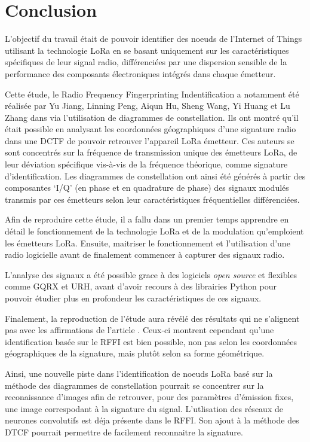 \chapter*{Conclusion}
\renewcommand{\leftmark}{CONCLUSION}

L'objectif du travail était de pouvoir identifier des noeuds de l'Internet of Things utilisant la technologie LoRa en se basant uniquement sur les caractéristiques spécifiques de leur signal radio, différenciées par une dispersion sensible de la performance des composants électroniques intégrés dans chaque émetteur.
\vspace{0.1cm}

Cette étude, le Radio Frequency Fingerprinting Indentification a notamment été réalisée par Yu Jiang, Linning Peng, Aiqun Hu, Sheng Wang, Yi Huang et Lu Zhang dans \cite{loraDCTF} via l'utilisation de diagrammes de constellation. Ils ont montré qu'il était possible en analysant les coordonnées géographiques d'une signature radio dans une DCTF de pouvoir retrouver l'appareil LoRa émetteur. Ces auteurs se sont concentrés sur la fréquence de transmission unique des émetteurs LoRa, de leur déviation spécifique vis-à-vis de la fréquence théorique, comme signature d'identification. Les diagrammes de constellation ont ainsi été générés à partir des composantes ‘I/Q’ (en phase et en quadrature de phase) des signaux modulés transmis par ces émetteurs selon leur caractéristiques fréquentielles différenciées.

\vspace{0.1cm}

Afin de reproduire cette étude, il a fallu dans un premier temps apprendre en détail le fonctionnement de la technologie LoRa et  de la modulation qu'emploient les émetteurs LoRa. Ensuite, maitriser le fonctionnement et l'utilisation d'une radio logicielle avant de finalement commencer à capturer des signaux radio.

\vspace{0.1cm}

L'analyse des signaux a été possible grace à des logiciels \textit{open source} et flexibles comme GQRX et URH, avant d'avoir recours à des librairies Python pour pouvoir étudier plus en profondeur les caractéristiques de ces signaux.

\vspace{0.1cm}

Finalement, la reproduction de l'étude aura révélé des résultats qui ne s'ali\-gnent pas avec les affirmations de l'article \cite{loraDCTF}. Ceux-ci montrent cependant qu'une identification basée sur le RFFI est bien possible, non pas selon les coordonnées géographiques de la signature, mais plutôt selon sa forme géométrique.

\vspace{0.1cm}

Ainsi, une nouvelle piste dans l'identification de noeuds LoRa basé sur la méthode des diagrammes de constellation pourrait se concentrer sur la reconaissance d'images afin de retrouver, pour des paramètres d'émission fixes, une image correspodant à la signature du signal. L'utlisation des réseaux de neurones convolutifs est déja présente dans le RFFI. Son ajout à la méthode des DTCF pourrait permettre de facilement reconnaitre la signature.